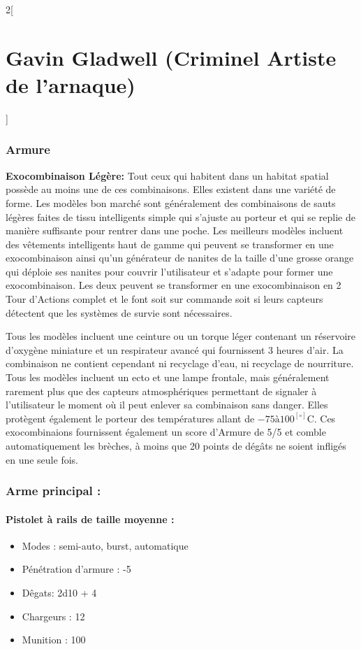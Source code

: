\documentclass[a4paper,9pt]{article}
\begin{document}
\begin{multicols}{2}[\section*{Gavin Gladwell (Criminel Artiste de l'arnaque)}]
   \subsubsection*{Armure}
\textbf{Exocombinaison Légère:} Tout ceux qui habitent dans un habitat
spatial possède au moins une de ces combinaisons. Elles existent dans une
variété de forme. Les modèles bon marché sont généralement des combinaisons de
sauts légères faites de tissu intelligents simple qui s'ajuste au porteur et qui
se replie de manière suffisante pour rentrer dans une poche. Les
meilleurs modèles incluent des vêtements intelligents haut de gamme qui peuvent
se transformer en une exocombinaison ainsi qu'un générateur de nanites de la
taille d'une grosse orange qui déploie ses nanites pour couvrir l'utilisateur
et s'adapte pour former une exocombinaison. Les deux peuvent se transformer en
une exocombinaison en 2 Tour d'Actions complet et le font soit sur commande soit
si leurs capteurs détectent que les systèmes de survie sont nécessaires. 

Tous les modèles incluent une ceinture ou un torque léger contenant un
réservoire d'oxygène miniature et un respirateur avancé qui fournissent 3
heures d'air. La combinaison ne contient cependant ni recyclage d'eau, ni
recyclage de nourriture. Tous les modèles incluent un ecto et une
lampe frontale, mais généralement rarement plus que des capteurs atmosphériques
permettant de signaler à l'utilisateur le moment où il peut enlever sa
combinaison sans danger. Elles protègent également le porteur des températures
allant de $-75 à 100^[\circ]$C. Ces exocombinaions fournissent également un
score d'Armure de 5/5 et comble automatiquement les brèches, à moins que 20
points de dégâts ne soient infligés en une seule fois.

\subsubsection*{Arme principal :}
\paragraph{Pistolet à rails de taille moyenne :}
\begin{itemize}
   \item Modes : semi-auto, burst, automatique
   \item Pénétration d'armure : -5
   \item Dêgats: 2d10 + 4
   \item Chargeurs : 12
   \item Munition : 100
\end{itemize}


\end{multicols}
\end{document}
